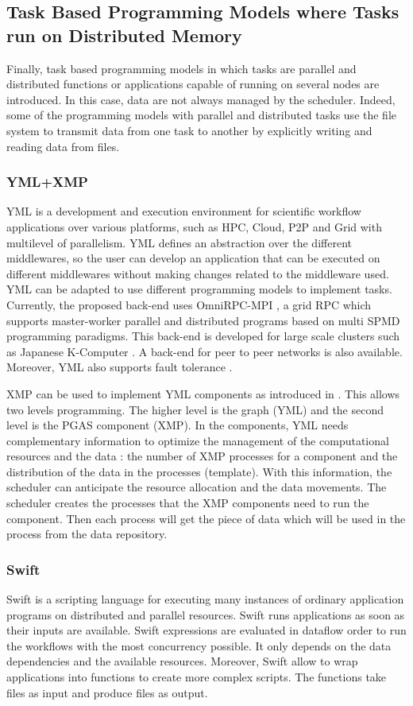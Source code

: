 \subsection{Task Based Programming Models where Tasks run on Distributed Memory}
Finally, task based programming models in which tasks are parallel and distributed functions or applications capable of running on several nodes are introduced.
In this case, data are not always managed by the scheduler.
Indeed, some of the programming models with parallel and distributed tasks use the file system to transmit data from one task to another by explicitly writing and reading data from files.

\subsubsection{YML+XMP}
YML \cite{DelEP2006} is a development and execution environment for scientific workflow applications over various platforms, such as HPC, Cloud, P2P and Grid with multilevel of parallelism.
YML defines an abstraction over the different middlewares, so the user can develop an application that can be executed on different middlewares without making changes related to the middleware used.
YML can be adapted to use different programming models to implement tasks.
Currently, the proposed back-end \cite{TsSHP2013} uses OmniRPC-MPI \cite{SaHTS2001}, a grid RPC which supports master-worker parallel and distributed programs based on multi SPMD programming paradigms.
This back-end is developed for large scale clusters such as Japanese K-Computer \cite{TsSHP2013}.
A back-end for peer to peer networks is also available.
Moreover, YML also supports fault tolerance \cite{TsuPS2015}.

XMP can be used to implement YML components as introduced in \cite{TsSHP2013}.
This allows two levels programming.
The higher level is the graph (YML) and the second level is the PGAS component (XMP).
In the components, YML needs complementary information to optimize the management of the computational resources and the data : the number of XMP processes for a component and the distribution of the data in the processes (template).
With this information, the scheduler can anticipate the resource allocation and the data movements.
The scheduler creates the processes that the XMP components need to run the component.
Then each process will get the piece of data which will be used in the process from the data repository.

\subsubsection{Swift}
Swift \cite{ZHCFL2007} \cite{WHWCK2011} is a scripting language for executing many instances of ordinary application programs on distributed and parallel resources.
Swift runs applications as soon as their inputs are available.
Swift expressions are evaluated in dataflow order to run the workflows with the most concurrency possible.
It only depends on the data dependencies and the available resources.
Moreover, Swift allow to wrap applications into functions to create more complex scripts.
The functions take files as input and produce files as output.

